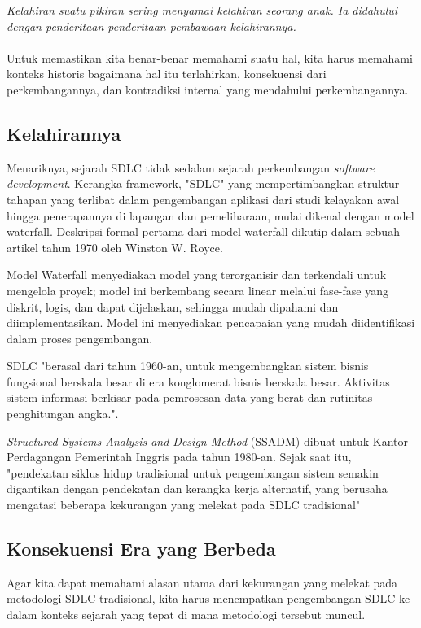 \emph{Kelahiran suatu pikiran sering menyamai kelahiran seorang anak. 
Ia didahului dengan penderitaan-penderitaan pembawaan kelahirannya.}\cite{tanmalaka}\\ \\Untuk
memastikan kita benar-benar memahami suatu hal, kita harus memahami konteks historis bagaimana hal itu terlahirkan,
konsekuensi dari perkembangannya, dan kontradiksi internal yang mendahului perkembangannya.

\subsection{Kelahirannya}
Menariknya, sejarah SDLC tidak sedalam sejarah perkembangan \emph{software development}. 
Kerangka framework, "SDLC" yang mempertimbangkan struktur tahapan yang terlibat dalam 
pengembangan aplikasi dari studi kelayakan awal hingga penerapannya di lapangan 
dan pemeliharaan, mulai dikenal dengan model waterfall. Deskripsi formal pertama dari model 
waterfall dikutip dalam sebuah artikel tahun 1970 oleh Winston W. Royce.\cite{Shantanu}

Model Waterfall menyediakan model yang terorganisir dan terkendali 
untuk mengelola proyek; model ini berkembang secara linear melalui 
fase-fase yang diskrit, logis, dan dapat dijelaskan, sehingga mudah dipahami dan 
diimplementasikan. Model ini menyediakan pencapaian yang mudah diidentifikasi dalam proses pengembangan. 

SDLC "berasal dari tahun 1960-an, untuk mengembangkan 
sistem bisnis fungsional berskala besar di era konglomerat bisnis berskala besar. 
Aktivitas sistem informasi berkisar pada pemrosesan data yang berat dan rutinitas penghitungan angka.".\cite[see p.86]{geoffrey}

\emph{Structured Systems Analysis and Design Method} (SSADM) dibuat untuk 
Kantor Perdagangan Pemerintah Inggris pada tahun 1980-an. Sejak saat itu, "pendekatan siklus hidup tradisional untuk pengembangan 
sistem semakin digantikan dengan pendekatan dan kerangka kerja alternatif, yang berusaha 
mengatasi beberapa kekurangan yang melekat pada SDLC tradisional"\cite[see p.86]{geoffrey}

\subsection{Konsekuensi Era yang Berbeda}
Agar kita dapat memahami alasan utama dari kekurangan yang melekat pada metodologi SDLC tradisional, 
kita harus menempatkan pengembangan SDLC ke dalam konteks sejarah yang tepat di mana metodologi tersebut muncul. 

